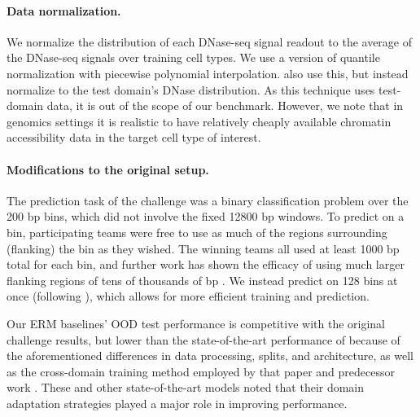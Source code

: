\paragraph{Data normalization. }

We normalize the distribution of each DNase-seq signal readout to the average of the DNase-seq signals over training cell types.
We use a version of quantile normalization \citep{bolstad2003comparison} with piecewise polynomial interpolation.
\cite{li2019leopard} also use this, but instead normalize to the test domain's DNase distribution.
As this technique uses test-domain data, it is out of the scope of our benchmark.
However, we note that in genomics settings it is realistic to have relatively cheaply available chromatin accessibility data in the target cell type of interest.

\paragraph{Modifications to the original setup. }
The prediction task of the challenge was a binary classification problem over the 200 bp bins, which did not involve the fixed 12800 bp windows.
To predict on a bin, participating teams were free to use as much of the regions surrounding (flanking) the bin as they wished.
The winning teams all used at least 1000 bp total for each bin, and further work has shown the efficacy of using much larger flanking regions of tens of thousands of bp \citep{quang2019factornet, enformer21}.
We instead predict on 128 bins at once (following \cite{li2019leopard}),
which allows for more efficient training and prediction.

Our ERM baselines' OOD test performance is competitive with the original challenge results, but lower than the state-of-the-art performance of \cite{li2019leopard} because of the aforementioned differences in data processing, splits, and architecture, as well as the cross-domain training method employed by that paper and predecessor work \citep{li2019anchor}.
These and other state-of-the-art models noted that their domain adaptation strategies played a major role in improving performance.
